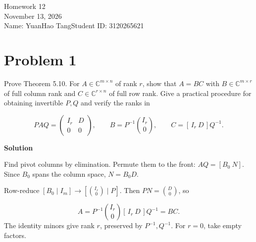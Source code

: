 \documentclass[UTF8,10pt,letterpaper,fontset=fandol]{ctexart}
\newcommand{\C}{\mathbb C}
\begin{document}
\begin{center}
{\LARGE Homework 12}\\[0.5em]
November 13, 2026\\[0.25em]
Name: YuanHao Tang\quad Student ID: 3120265621
\end{center}
\section{Problem 1}
Prove Theorem 5.10. For $A\in\C^{m\times n}$ of rank $r$, show that $A=BC$ with $B\in\C^{m\times r}$ of full column rank and $C\in\C^{r\times n}$ of full row rank. Give a practical procedure for obtaining invertible $P,Q$ and verify the ranks in\par
\[
 PAQ=\begin{pmatrix}I_r&D\\0&0\end{pmatrix},\qquad
 B=P^{-1}\binom{I_r}{0},\qquad C=[\,I_r\ D\,]Q^{-1}.
\]
\par{}\textbf{Solution}\par
Find pivot columns by elimination. Permute them to the front: $AQ=[B_0\ N]$. Since $B_0$ spans the column space, $N=B_0D$.\par
Row-reduce $[B_0\mid I_m]\longrightarrow[\binom{I_r}{0}\mid P]$. Then $PN=\binom D0$, so\par
\[
 A=P^{-1}\binom{I_r}{0}[\,I_r\ D\,]Q^{-1}=BC.
\]
The identity minors give rank $r$, preserved by $P^{-1},Q^{-1}$. For $r=0$, take empty factors.\par
\end{document}
